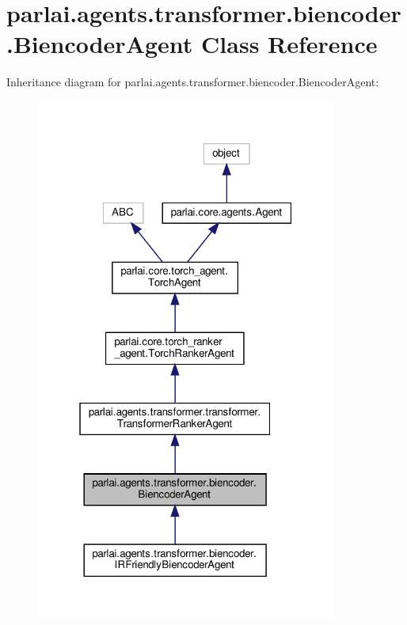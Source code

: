 \hypertarget{classparlai_1_1agents_1_1transformer_1_1biencoder_1_1BiencoderAgent}{}\section{parlai.\+agents.\+transformer.\+biencoder.\+Biencoder\+Agent Class Reference}
\label{classparlai_1_1agents_1_1transformer_1_1biencoder_1_1BiencoderAgent}


Inheritance diagram for parlai.\+agents.\+transformer.\+biencoder.\+Biencoder\+Agent\+:\nopagebreak
\begin{figure}[H]
\begin{center}
\leavevmode
\includegraphics[width=280pt]{d8/d7c/classparlai_1_1agents_1_1transformer_1_1biencoder_1_1BiencoderAgent__inherit__graph}
\end{center}
\end{figure}


